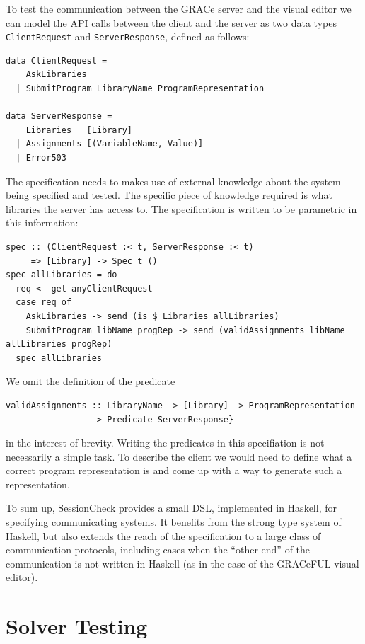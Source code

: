 \documentclass{article}
\begin{document}
To test the communication between the GRACe server and the visual editor we can model
the API calls between the client and the server as
two data types \texttt{ClientRequest} and
\texttt{ServerResponse}, defined as follows:
%
\begin{verbatim}
data ClientRequest =
    AskLibraries
  | SubmitProgram LibraryName ProgramRepresentation

data ServerResponse =
    Libraries   [Library]
  | Assignments [(VariableName, Value)]
  | Error503
\end{verbatim}

The specification needs to makes use of external knowledge about the system
being specified and tested.
%
The specific piece of knowledge required is what libraries the server has access
to.
%
The specification is written to be parametric in this information:

\begin{verbatim}
spec :: (ClientRequest :< t, ServerResponse :< t)
     => [Library] -> Spec t ()
spec allLibraries = do
  req <- get anyClientRequest
  case req of
    AskLibraries -> send (is $ Libraries allLibraries)
    SubmitProgram libName progRep -> send (validAssignments libName allLibraries progRep)
  spec allLibraries
\end{verbatim}

We omit the definition of the predicate
\begin{verbatim}
validAssignments :: LibraryName -> [Library] -> ProgramRepresentation 
                 -> Predicate ServerResponse}
\end{verbatim}
in the interest of brevity.
%
Writing the predicates in this specifiation is not necessarily a simple task.
%
To describe the client we would need to define what a correct program representation is
and come up with a way to generate such a representation.

To sum up, SessionCheck provides a small DSL, implemented in Haskell,
for specifying communicating systems.
%
It benefits from the strong type system of Haskell, but also extends
the reach of the specification to a large class of communication
protocols, including cases when the ``other end'' of the communication
is not written in Haskell (as in the case of the GRACeFUL visual
editor).

\section{Solver Testing}

\end{document}
